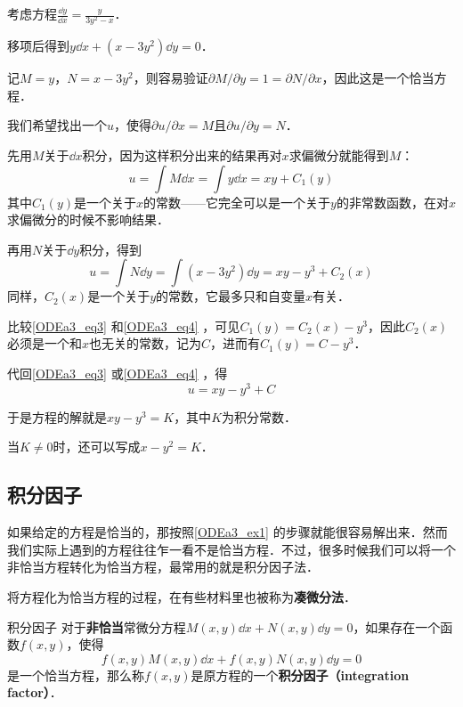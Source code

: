 \begin{example}{}\label{ODEa3_ex1}
考虑方程$\frac{\dd y}{\dd x}=\frac{y}{3y^2-x}$．

移项后得到$y\dd x+(x-3y^2)\dd y=0$．

记$M=y$，$N=x-3y^2$，则容易验证$\partial M/\partial y= 1 =\partial N/\partial x$，因此这是一个恰当方程．

我们希望找出一个$u$，使得$\partial u/\partial x=M$且$\partial u/\partial y=N$．

先用$M$关于$\dd x$积分，因为这样积分出来的结果再对$x$求偏微分就能得到$M$：
\begin{equation}\label{ODEa3_eq3}
u=\int M\dd x=\int y\dd x=xy+C_1(y)
\end{equation}
其中$C_1(y)$是一个关于$x$的常数——它完全可以是一个关于$y$的非常数函数，在对$x$求偏微分的时候不影响结果．

再用$N$关于$\dd y$积分，得到
\begin{equation}\label{ODEa3_eq4}
u=\int N\dd y=\int (x-3y^2)\dd y=xy-y^3+C_2(x)
\end{equation}
同样，$C_2(x)$是一个关于$y$的常数，它最多只和自变量$x$有关．

比较\autoref{ODEa3_eq3} 和\autoref{ODEa3_eq4} ，可见$C_1(y)=C_2(x)-y^3$，因此$C_2(x)$必须是一个和$x$也无关的常数，记为$C$，进而有$C_1(y)=C-y^3$．

代回\autoref{ODEa3_eq3} 或\autoref{ODEa3_eq4} ，得
\begin{equation}
u=xy-y^3+C
\end{equation}

于是方程的解就是$xy-y^3=K$，其中$K$为积分常数．

当$K\not=0$时，还可以写成$x-y^2=K$．

\end{example}


\subsection{积分因子}

如果给定的方程是恰当的，那按照\autoref{ODEa3_ex1} 的步骤就能很容易解出来．然而我们实际上遇到的方程往往乍一看不是恰当方程．不过，很多时候我们可以将一个非恰当方程转化为恰当方程，最常用的就是积分因子法．

将方程化为恰当方程的过程，在有些材料里也被称为\textbf{凑微分法}．

\begin{definition}{积分因子}
对于\textbf{非恰当}常微分方程$M(x, y)\dd x+N(x, y)\dd y=0$，如果存在一个函数$f(x, y)$，使得
\begin{equation}\label{ODEa3_eq5}
f(x, y)M(x, y)\dd x+f(x, y)N(x, y)\dd y=0
\end{equation}
是一个恰当方程，那么称$f(x, y)$是原方程的一个\textbf{积分因子（integration factor）}．
\end{definition}

